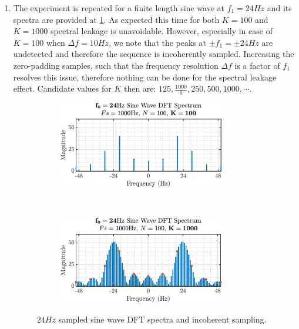 \begin{enumerate}[label=\alph*), leftmargin=*]
\item
%
The experiment is repeated for a finite length sine wave at $f_{1}=24Hz$ and its spectra are provided at \ref{fig:1_1_c}.
As expected this time for both $K=100$ and $K=1000$ spectral leakage is unavoidable. However, especially in case of $K=100$
when $\Delta f = 10Hz$, we note that the peaks at $\pm f_{1} = \pm 24Hz$ are undetected and therefore the sequence is
incoherently sampled. Increasing the zero-padding samples, such that the frequency resolution $\Delta f$ is a factor of $f_{1}$
resolves this issue, therefore nothing can be done for the spectral leakage effect. Candidate values for $K$ then are:
$125, \frac{1000}{6}, 250, 500, 1000, \cdots$.
%
\begin{figure}[H]
    \centering
    \begin{subfigure}{0.49\textwidth}
        \centering
        \includegraphics[height=1.5in]{report/spectrum-estimation/discete-fourier-transform-basics/assets/c/dft-f0_24-K_100}
    \end{subfigure}
    ~ 
    \begin{subfigure}{0.49\textwidth}
        \centering
        \includegraphics[height=1.5in]{report/spectrum-estimation/discete-fourier-transform-basics/assets/c/dft-f0_24-K_1000}
    \end{subfigure}
    \caption{$24Hz$ sampled sine wave DFT spectra and incoherent sampling.}
    \label{fig:1_1_c}
\end{figure}
\end{enumerate}